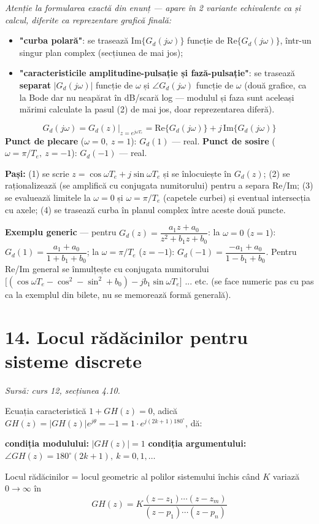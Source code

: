\documentclass[10pt,a4paper]{article}
\newcommand{\srcnote}[1]{{\footnotesize\color{gray!55!black}\textit{Sursă: #1}}\par}
\begin{document}
\textit{Atenție la formularea exactă din enunț — apare în 2 variante echivalente ca și calcul, diferite ca reprezentare grafică finală:}
\begin{itemize}
\item \textbf{"curba polară"}: se trasează $\mathrm{Im}\{G_d(j\omega)\}$ funcție de $\mathrm{Re}\{G_d(j\omega)\}$, într-un singur plan complex (secțiunea de mai jos);
\item \textbf{"caracteristicile amplitudine-pulsație și fază-pulsație"}: se trasează \textbf{separat} $|G_d(j\omega)|$ funcție de $\omega$ și $\angle G_d(j\omega)$ funcție de $\omega$ (două grafice, ca la Bode dar nu neapărat în dB/scară log — modulul și faza sunt aceleași mărimi calculate la pasul (2) de mai jos, doar reprezentarea diferă).
\end{itemize}
\begin{keyeq}\color{red!65!black}
$$G_d(j\omega)=G_d(z)\big|_{z=e^{j\omega T_e}}=\mathrm{Re}\{G_d(j\omega)\}+j\,\mathrm{Im}\{G_d(j\omega)\}$$
\textbf{Punct de plecare} ($\omega{=}0,\ z{=}1$): $G_d(1)$ — real. \quad\textbf{Punct de sosire} ($\omega{=}\pi/T_e,\ z{=}-1$): $G_d(-1)$ — real.
\end{keyeq}
\textbf{Pași:} (1) se scrie $z=\cos\omega T_e+j\sin\omega T_e$ și se înlocuiește în $G_d(z)$; (2) se raționalizează (se amplifică cu conjugata numitorului) pentru a separa Re/Im; (3) se evaluează limitele la $\omega=0$ și $\omega=\pi/T_e$ (capetele curbei) și eventual intersecția cu axele; (4) se trasează curba în planul complex între aceste două puncte.

\textbf{Exemplu generic} — pentru $G_d(z)=\dfrac{a_1z+a_0}{z^2+b_1z+b_0}$: la $\omega{=}0$ ($z{=}1$): $G_d(1)=\dfrac{a_1+a_0}{1+b_1+b_0}$; la $\omega{=}\pi/T_e$ ($z{=}{-}1$): $G_d(-1)=\dfrac{-a_1+a_0}{1-b_1+b_0}$. Pentru Re/Im general se înmulțește cu conjugata numitorului $\big[(\cos\omega T_e{-}\cos^2{-}\sin^2{+}b_0)-jb_1\sin\omega T_e\big]$ ... etc. (se face numeric pas cu pas ca la exemplul din bilete, nu se memorează formă generală).

\section*{14. Locul rădăcinilor pentru sisteme discrete}\label{sec:14}
\srcnote{curs 12, secțiunea 4.10.}
Ecuația caracteristică $1+GH(z)=0$, adică $GH(z)=|GH(z)|e^{j\theta}=-1=1\cdot e^{j(2k+1)180^\circ}$, dă:
\begin{keyeq}\color{red!65!black}
\textbf{condiția modulului:} $|GH(z)|=1$ \qquad \textbf{condiția argumentului:} $\angle GH(z)=180^\circ(2k+1),\ k=0,1,\dots$
\end{keyeq}
Locul rădăcinilor = locul geometric al polilor sistemului închis când $K$ variază $0\to\infty$ în
$$GH(z)=K\dfrac{(z-z_1)\cdots(z-z_m)}{(z-p_1)\cdots(z-p_n)}$$
\end{document}
